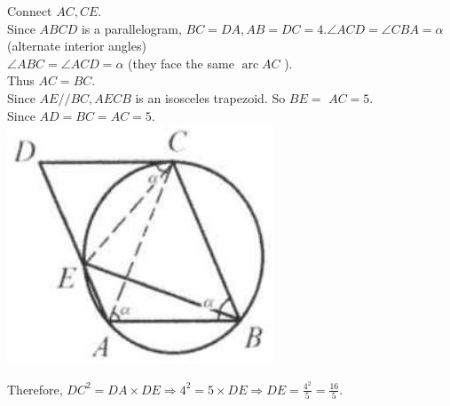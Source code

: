 \documentclass{article}
\begin{document}
Connect \(A C, C E\).\\
Since \(A B C D\) is a parallelogram, \(B C=D A, A B=D C=4 . \angle A C D=\angle C B A=\alpha\) (alternate interior angles)\\
\(\angle A B C=\angle A C D=\alpha\) (they face the same \(\operatorname{arc} A C\) ).\\
Thus \(A C=B C\).\\
Since \(A E / / B C, A E C B\) is an isosceles trapezoid. So \(B E=\) \(A C=5\).\\
Since \(A D=B C=A C=5\).\\
\centering
\includegraphics[width=\textwidth]{images/167(2).jpg}

Therefore, \(D C^{2}=D A \times D E \Rightarrow 4^{2}=5 \times D E \Rightarrow D E=\frac{4^{2}}{5}=\frac{16}{5}\).
\end{document}
